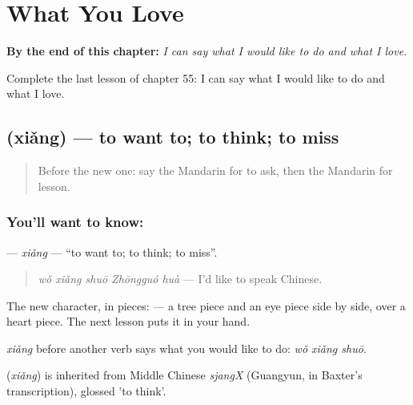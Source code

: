 
\chapter{What You Love}
\label{ch:zh-what-you-love}

\begin{chapteropening}
\textbf{By the end of this chapter:} \emph{I can say what I would like to do and what I love.}

Complete the last lesson of chapter 55: I can say what I would like to do and what I love.
\end{chapteropening}

\section[\texorpdfstring{\zh{想} (xiǎng)}{想 (xiǎng)}]{ (xiǎng) — to want to; to think; to miss}

\label{lesson:ZH-C55-xiang}



\begin{quote}
Before the new one: say the Mandarin for to ask, then the Mandarin for lesson.
\end{quote}

\subsection*{You'll want to know: }
\textbf{} — \emph{xiǎng} — \textquotedblleft{}to want to; to think; to miss\textquotedblright{}.

\begin{quote}
\textbf{} \emph{wǒ xiǎng shuō Zhōngguó huà} — I'd like to speak Chinese.
\end{quote}

The new character, in pieces:  — a tree piece and an eye piece side by side, over a heart piece. The next lesson puts it in your hand.

\emph{xiǎng} before another verb says what you would like to do: \emph{wǒ xiǎng shuō}.

\begin{cousinweb}
\textbf{} (\emph{xiǎng}) is inherited from Middle Chinese \emph{sjangX} (Guangyun, in Baxter's transcription), glossed 'to think'.
\end{cousinweb}

